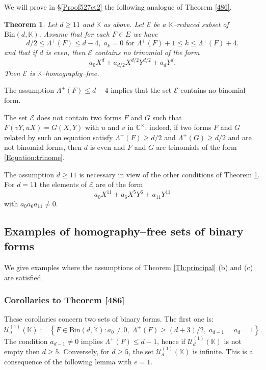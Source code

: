 \documentclass[10pt]{article}
\newtheorem{theorem}{Theorem}[section]
\theoremstyle{definition}
\numberwithin{equation}{section}
\newcommand {\C}{{\mathbb{C}}}
\newcommand {\K}{{\mathbb{K}}}
\newcommand{\Bin}{\mathrm {Bin}}
\begin{document}
 We will prove in \S \ref{Proof527et2} the following analogue of Theorem \ref{486}.

\begin{theorem} \label{527} Let $d\geqslant 11$ and $\K$ as above. Let $\mathcal E$ be a $\K$--reduced subset of $\Bin (d, \K)$.
Assume that for each $F\in E$ we have 
\[
d/2\leqslant \Lambda^+ (F)\leqslant d-4, \; a_k =0 \text{ for } \Lambda^+ (F)+1 \leqslant k \leqslant \Lambda^+ (F) +4.
\]
and that if $d$ is even, then $\mathcal E $ contains no trinomial of the form
\begin{equation}\label{Equation:trinome}
a_0 X^d + a_{d/2} X^{d/2} Y^{d/2} + a_d Y^d. 
\end{equation}
Then $\mathcal E$ is $\K$--homography--free.
\end{theorem}
 
 The assumption $ \Lambda^+ (F)\leqslant d-4$ implies that the set $\mathcal E $ contains no binomial form. 
 
 The set $\mathcal E$ does not contain two forms $F$ and $G$ such that $F(vY,uX)=G(X,Y)$ with $u$ and $v$ in $\C^\times$: indeed, if two forms $F$ and $G$ related by such an equation satisfy $\Lambda^+ (F)\geqslant d/2$ and $\Lambda^+ (G)\geqslant d/2$ and are not binomial forms, then $d$ is even and $F$ and $G$ are trinomials of the form \eqref{Equation:trinome}.
 
 The assumption $d\geqslant 11$ is necessary in view of the other conditions of Theorem \ref{527}. For $d = 11$ the elements of $\mathcal E$ are of the form
\[
a_0X^{11}+a_6X^5Y^6+a_{11}Y^{11}
\]
with $a_0a_6a_{11}\not=0$. 
 
\subsection{Examples of homography--free sets of binary forms}\label{SS:HomographyFreeSets}

We give examples where the assumptions of Theorem \ref{Th:principal} (b) and (c) are satisfied. 

\subsubsection{Corollaries to Theorem \ref{486}} 

These corollaries concern two sets of binary forms.
The first one is:
\begin{equation}\label{defUd1}
\mathcal U^{(1)}_{d}(\K):= 
\left\{ F\in \Bin (d, \K) : a_0\neq 0, \; \Lambda^+ (F) \geqslant (d+3)/2, \; a_{d-1}= a_d =1 \right\}.
\end{equation}
 The condition $a_{d-1}\not=0$ implies $\Lambda^+ (F) \leqslant d-1$, hence if $\mathcal U^{(1)}_{d}(\K)$ is not empty then $d\geqslant 5$. Conversely, for $d\geqslant 5$, the set $\mathcal U^{(1)}_{d}(\K)$ is infinite. This is a consequence of the following lemma with $e=1$.
\end{document}
